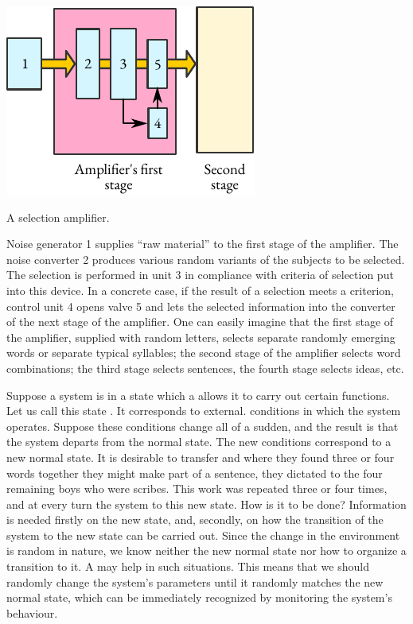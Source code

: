 \begin{marginfigure}[-3cm]%
 \centering
 \includegraphics[width=\linewidth]{figures/selection-amp.pdf}
 \caption{A selection amplifier.\label{selection-amp}}
 \end{marginfigure}
Noise generator 1 supplies ``raw material'' to the first stage of the
amplifier. The noise converter 2 produces various random variants of
the subjects to be selected. The selection is performed in unit 3 in
compliance with criteria of selection put into this device. In a concrete
case, if the result of a selection meets a criterion, control unit 4 opens
valve 5 and lets the selected information into the converter of the next
stage of the amplifier. One can easily imagine that the first stage of the
amplifier, supplied with random letters, selects separate randomly
emerging words or separate typical syllables; the second stage of the
amplifier selects word combinations; the third stage selects sentences,
the fourth stage selects ideas, etc.

 Suppose
a system is in a state which a allows it to carry out certain functions. Let
us call this state . It corresponds to external. conditions in which
the system operates. Suppose these conditions change all of a sudden,
and the result is that the system departs from the normal state. The new
conditions correspond to a new normal state. It is desirable to transfer
and where they found three or four words together they might make
part of a sentence, they dictated to the four remaining boys who were
scribes. This work was repeated three or four times, and at every turn
the system to this new state. How is it to be done? Information is
needed firstly on the new state, and, secondly, on how the transition of
the system to the new state can be carried out. Since the change in the
environment is random in nature, we know neither the new normal state
nor how to organize a transition to it. A  may help in
such situations. This means that we should randomly change the
system's parameters until it randomly matches the new normal state,
which can be immediately recognized by monitoring the system's
behaviour.

